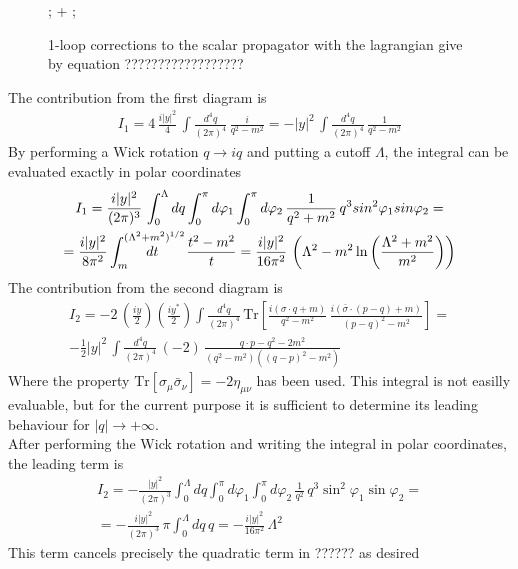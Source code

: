 \documentclass[12pt]{article}
\begin{document}
\begin{figure}[h]
  \centering
  ; 
\quad + \qquad
{};
\caption{1-loop corrections to the scalar propagator with the lagrangian give by equation ??????????????????}
\end{figure}
\raggedright The contribution from the first diagram is
\begin{gather*}
  I_1 = 4 \,\frac{i|y|^2}{4} \, \int \frac{d^4 q}{(2\pi)^4} \, \frac{i}{q^2 - m^2} = - |y|^2 \, \int \frac{d^4 q}{(2\pi)^4} \, \frac{1}{q^2 - m^2}
\end{gather*}
By performing a Wick rotation $q \to iq$ and putting a cutoff $\Lambda$, the integral can be evaluated exactly in polar coordinates 
\begin{gather*}
  I_1 = \frac{i |y|^2}{(2\pi)^3} \, \int_0^\Lambda dq \int_0^\pi d\varphi_1 \int_0^{\pi} d\varphi_2 \, \frac{1}{q^2 + m^2} \, q^3 sin^2\varphi_1 sin\varphi_2 = \\
  = \frac{i |y|^2}{8\pi^2} \int_{m}^{(\Lambda^2 + m^2)^{1/2}} \hspace{-3em} dt \qquad \frac{t^2 - m^2}{t} = \frac{i|y|^2}{16\pi^2} \, \left(\Lambda^2 - m^2 \ln\left(\frac{\Lambda^2 + m^2}{m^2}\right)\right)
\end{gather*}
The contribution from the second diagram is 
\begin{gather*}
  I_2 = - 2 \, \left(\frac{iy}{2}\right)\left(\frac{iy^*}{2}\right) \int \frac{d^4 q}{(2\pi)^4} \, \text{Tr}\left[\frac{i(\sigma \cdot q + m)}{q^2 - m^2} \, \frac{i(\bar\sigma \cdot (p-q) + m)}{(p-q)^2 - m^2}\right] = \\
  - \frac{1}{2} |y|^2 \, \int \frac{d^4 q}{(2\pi)^4} \, (-2) \, \frac{q\cdot p - q^2 - 2m^2}{(q^2-m^2) ((q-p)^2-m^2)}
\end{gather*}
Where the property $\text{Tr}[\sigma_\mu \bar\sigma_\nu] = -2\eta_{\mu\nu}$ has been used. This integral is not easilly evaluable, but for the current purpose it is sufficient to determine its leading behaviour for $|q| \to +\infty$. \\
After performing the Wick rotation and writing the integral in polar coordinates, the leading term is 
\begin{gather*}
  I_2 = - \frac{|y|^2}{(2\pi)^3} \int_0^\Lambda dq \int_0^\pi d\varphi_1 \int_0^{\pi} d\varphi_2 \, \frac{1}{q^2} \, q^3\sin^2\varphi_1\sin\varphi_2 = \\ 
  = - \frac{i|y|^2}{(2\pi)^3} \, \pi \int_0^\Lambda dq \, q = - \frac{i|y|^2}{16\pi^2} \, \Lambda^2
\end{gather*}
This term cancels precisely the quadratic term in ?????? as desired
\end{document}

